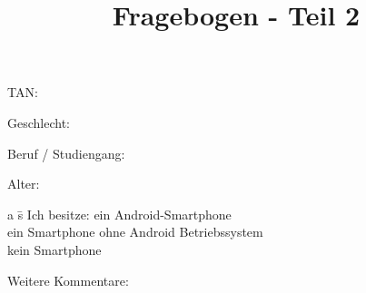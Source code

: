 \documentclass[10pt,a4paper]{scrartcl}
\title{Fragebogen - Teil 2}
\date{\vspace{-5ex}}
\begin{document}
\maketitle
\pagestyle{empty}

\vspace{2 cm}

TAN: \dotfill\\

\vspace{2 cm}

Geschlecht: \dotfill\\

\vspace{2 cm}

Beruf / Studiengang: \dotfill\\

\vspace{2 cm}

Alter: \dotfill\\

\vspace{2 cm}

\begin{tabbing}
	\hspace{4cm} a \= s \kill
	\hspace*{2mm} Ich besitze: \> \textbigcircle \hspace{0.1cm} ein Android-Smartphone \\ 
	\> \textbigcircle \hspace{0.1cm} ein Smartphone ohne Android Betriebssystem \\ 
	\> \textbigcircle \hspace{0.1cm} kein Smartphone
\end{tabbing} 

\vspace{2 cm}

Weitere Kommentare: \dotfill\\
\end{document}
